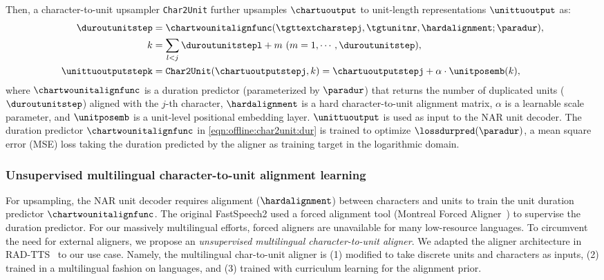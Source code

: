 Then, a character-to-unit upsampler \texttt{Char2Unit} further upsamples $\chartuoutput$ to unit-length representations $\unittuoutput$ as:
\begin{align}
\duroutunitstep & = \chartwounitalignfunc(\tgttextcharstepj, \tgtunitnr, \hardalignment; \paradur), \label{eqn:offline:char2unit:dur} \\
k &= \sum_{l<j} \duroutunitstepl + m \ (m = 1, \cdots, \duroutunitstep), \\
\unittuoutputstepk & = \texttt{Char2Unit}(\chartuoutputstepj, k)  = \chartuoutputstepj + \alpha \cdot \unitposemb(k),
\end{align}
where $\chartwounitalignfunc$ is a duration predictor (parameterized by $\paradur$) that returns the number of duplicated units ($\duroutunitstep$) aligned with the $j$-th character,
$\hardalignment$ is a hard character-to-unit alignment matrix, 
$\alpha$ is a learnable scale parameter, 
and $\unitposemb$ is a unit-level positional embedding layer.
$\unittuoutput$ is used as input to the NAR unit decoder.
The duration predictor $\chartwounitalignfunc$ in \cref{eqn:offline:char2unit:dur} is trained to optimize $\lossdurpred(\paradur)$, a mean square error (MSE) loss taking the duration predicted by the aligner as training target in the logarithmic domain.

\subsubsection{Unsupervised multilingual character-to-unit alignment learning}\label{sec:offline:unity2:unsup_aligner}
For upsampling, the NAR unit decoder requires alignment ($\hardalignment$) between characters and units to train the unit duration predictor $\chartwounitalignfunc$.
The original FastSpeech2 used a forced alignment tool (\eg Montreal Forced Aligner~\citep{mcauliffe2017montreal}) to supervise the duration predictor.
For our massively multilingual efforts, forced aligners are unavailable for many low-resource languages.
To circumvent the need for external aligners, we propose an \textit{unsupervised multilingual character-to-unit aligner}.
We adapted the aligner architecture in RAD-TTS~\citep{shih2021rad} to our use case.
Namely, the \mfourttwo multilingual char-to-unit aligner is 
(1) modified to take discrete units and characters as inputs,
(2) trained in a multilingual fashion on \ntslangs languages, and
(3) trained with curriculum learning for the alignment prior.

